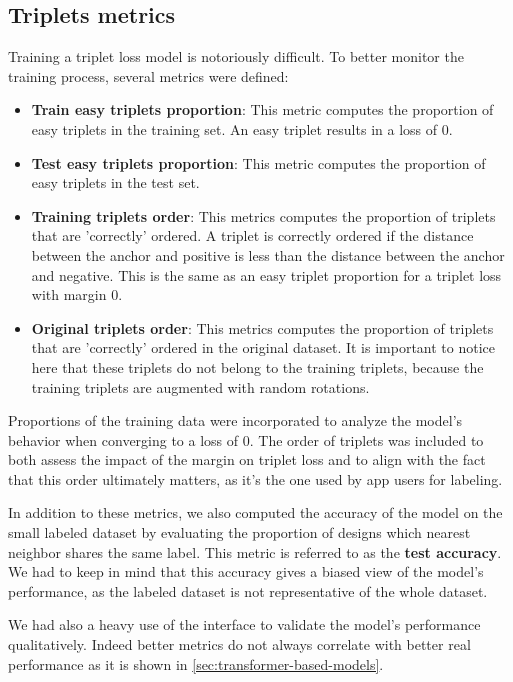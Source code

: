 \subsection{Triplets metrics} 
\label{sec:triplet-metrics}

Training a triplet loss model is notoriously difficult. To better monitor the training process, several metrics were defined:
\begin{itemize}
    \item \textbf{Train easy triplets proportion}: This metric computes the proportion of easy triplets in the training set. An easy triplet results in a loss of 0.
    \item \textbf{Test easy triplets proportion}: This metric computes the proportion of easy triplets in the test set. 
    \item \textbf{Training triplets order}: This metrics computes the proportion of triplets that are 'correctly' ordered. A triplet is correctly ordered if the distance between the anchor and positive is less than the distance between the anchor and negative. This is the same as an easy triplet proportion for a triplet loss with margin 0.
    \item \textbf{Original triplets order}: This metrics computes the proportion of triplets that are 'correctly' ordered in the original dataset. It is important to notice here that these triplets do not belong to the training triplets, because the training triplets are augmented with random rotations.
\end{itemize}

Proportions of the training data were incorporated to analyze the model's behavior when converging to a loss of 0. The order of triplets was included to both assess the impact of the margin on triplet loss and to align with the fact that this order ultimately matters, as it's the one used by app users for labeling.

In addition to these metrics, we also computed the accuracy of the model on the small labeled dataset by evaluating the proportion of designs which nearest neighbor shares the same label. This metric is referred to as the \textbf{test accuracy}. We had to keep in mind that this accuracy gives a biased view of the model's performance, as the labeled dataset is not representative of the whole dataset.

We had also a heavy use of the interface to validate the model's performance qualitatively. Indeed better metrics do not always correlate with better real performance as it is shown in \autoref{sec:transformer-based-models}.

